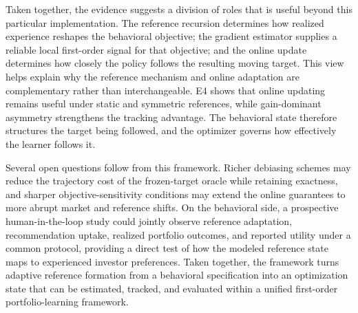 Taken together, the evidence suggests a division of roles that is useful beyond this particular implementation.  The reference recursion determines how realized experience reshapes the behavioral objective; the gradient estimator supplies a reliable local first-order signal for that objective; and the online update determines how closely the policy follows the resulting moving target.  This view helps explain why the reference mechanism and online adaptation are complementary rather than interchangeable.  E4 shows that online updating remains useful under static and symmetric references, while gain-dominant asymmetry strengthens the tracking advantage.  The behavioral state therefore structures the target being followed, and the optimizer governs how effectively the learner follows it.

Several open questions follow from this framework.  Richer debiasing schemes may reduce the trajectory cost of the frozen-target oracle while retaining exactness, and sharper objective-sensitivity conditions may extend the online guarantees to more abrupt market and reference shifts.  On the behavioral side, a prospective human-in-the-loop study could jointly observe reference adaptation, recommendation uptake, realized portfolio outcomes, and reported utility under a common protocol, providing a direct test of how the modeled reference state maps to experienced investor preferences.  Taken together, the framework turns adaptive reference formation from a behavioral specification into an optimization state that can be estimated, tracked, and evaluated within a unified first-order portfolio-learning framework.
